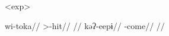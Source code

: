 \pex<exp>\akuriyo
\begin{multicols}{2}
\begingl
\gla wi-toka//
\glb {}>-hit//
\glft {} \parencite[][86]{gildea1994akuriyo}//
\endgl
{}
\begingl
\gla kəʔ-eepɨ//
\glb {}-come//
\glft {} \parencite[][114]{meira1998proto}//
\endgl
\end{multicols}
\xe
%
%
%
%


%

